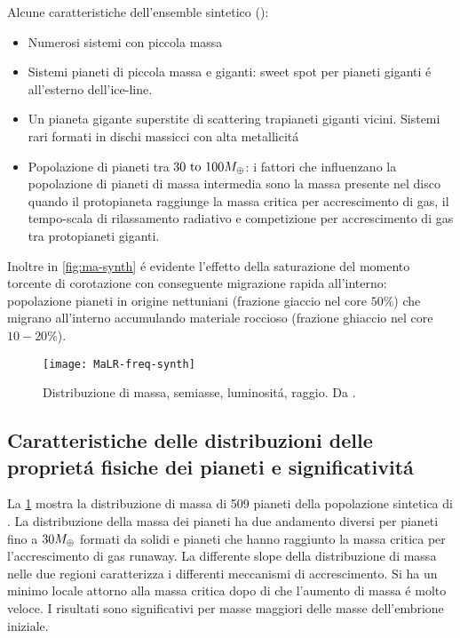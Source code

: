 Alcune caratteristiche dell'ensemble sintetico (\cite{mordasini2018planetary}):
\begin{itemize}
\item Numerosi sistemi con piccola massa
\item Sistemi pianeti di piccola massa e giganti: sweet spot per pianeti giganti \'e all'esterno dell'ice-line.
\item Un pianeta gigante superstite di scattering trapianeti giganti vicini. Sistemi rari formati in dischi massicci con alta metallicit\'a
\item Popolazione di pianeti tra $\numrange{30}{100}\mearth{}$: i fattori che influenzano la popolazione di pianeti di massa intermedia sono la massa presente nel disco quando il protopianeta raggiunge la massa critica per accrescimento di gas, il tempo-scala di rilassamento radiativo e competizione per accrescimento di gas tra protopianeti giganti.
\end{itemize}

Inoltre in \ref{fig:ma-synth} \'e evidente l'effetto della saturazione del momento torcente di corotazione con conseguente migrazione rapida all'interno: popolazione pianeti in origine nettuniani (frazione giaccio nel core $50\%$) che migrano all'interno accumulando materiale roccioso (frazione ghiaccio nel core $10-20\%$).

\begin{figure}[!ht]
\texttt{[image: MaLR-freq-synth]}\label{fig:MaLR-freq-synth}
\caption{Distribuzione di massa, semiasse, luminosit\'a, raggio. Da \cite{mordasini2018planetary}. }
\end{figure}

\subsection{Caratteristiche delle distribuzioni delle propriet\'a fisiche dei pianeti e significativit\'a}

La \ref{fig:MaLR-freq-synth} mostra la distribuzione di massa di 509 pianeti della popolazione sintetica di \cite{mordasini2018planetary}. La distribuzione della massa dei pianeti ha due andamento diversi per pianeti fino a $30M_{\oplus}{}$ formati da solidi e pianeti che hanno raggiunto la massa critica per l'accrescimento di gas runaway. La differente slope della distribuzione di massa nelle due regioni caratterizza i differenti meccanismi di accrescimento. Si ha un minimo locale attorno alla massa critica dopo di che l'aumento di massa \'e molto veloce. I risultati sono significativi per masse maggiori delle masse dell'embrione iniziale.

